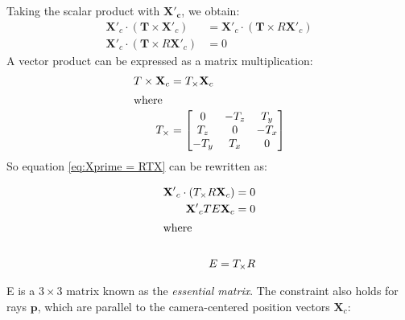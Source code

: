 Taking the scalar product with $\mathbf{X'_c}$, we obtain:
\begin{align}
    \mathbf{X'}_c \cdot (\mathbf{T} \times \mathbf{X'}_c) &= \mathbf{X'}_c\cdot (\mathbf{T} \times R\mathbf{X'}_c)\nonumber \\
    \mathbf{X'}_c \cdot (\mathbf{T} \times R\mathbf{X'}_c) &= 0 \nonumber
\end{align}
A vector product can be expressed as a matrix multiplication:
\begin{align}
T \times \mathbf{X}_c &= T_\times \mathbf{X}_c \\
\intertext{where}
T_\times &=\begin{bmatrix}
0    & -T_z  & T_y\\
T_z  & 0     & -T_x\\
-T_y  & T_x   & 0
\end{bmatrix}
\end{align}
So equation \eqref{eq:Xprime = RTX} can be rewritten as:

\begin{align}
\mathbf{X'}_c \cdot (T_\times R\mathbf{X}_c) = 0 \nonumber\\
\mathbf{X'}_c T E \mathbf{X}_c = 0  \nonumber\\
\intertext{where}  \nonumber\\
E = T_\times R \nonumber
\end{align}

E is a $3 \times 3$ matrix known as the \emph{essential matrix}.
The constraint also holds for rays $\mathbf{p}$, which are parallel to the camera-centered position vectors $\mathbf{X}_c$:

